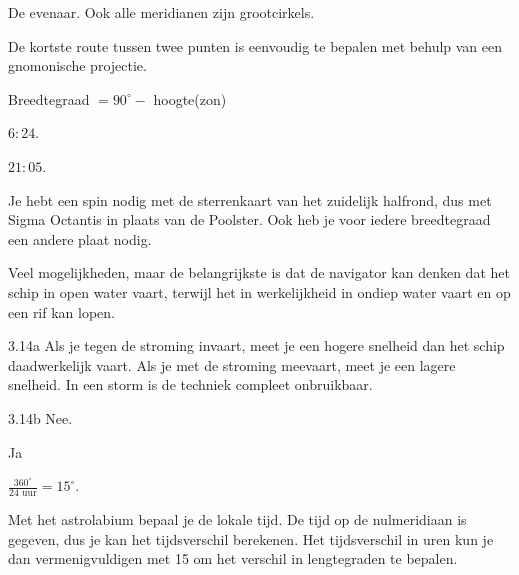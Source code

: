 \begin{Antwoord}{2.14}
		De evenaar. Ook alle meridianen zijn grootcirkels.
	
\end{Antwoord}
\begin{Antwoord}{2.15}
		De kortste route tussen twee punten is eenvoudig te bepalen met behulp van een gnomonische projectie.
	
\end{Antwoord}
\begin{Antwoord}{3.6}
  Breedtegraad $= 90^{\circ} -$ hoogte(zon)
 
\end{Antwoord}
\begin{Antwoord}{3.8}
  $6:24$.
 
\end{Antwoord}
\begin{Antwoord}{3.9}
  $21:05$.
 
\end{Antwoord}
\begin{Antwoord}{3.12}
  Je hebt een spin nodig met de sterrenkaart van het zuidelijk halfrond, dus met Sigma Octantis in plaats van de Poolster. Ook heb je voor iedere breedtegraad een andere plaat nodig.
 
\end{Antwoord}
\begin{Antwoord}{3.13}
  Veel mogelijkheden, maar de belangrijkste is dat de navigator kan denken dat het schip in open water vaart, terwijl het in werkelijkheid in ondiep water vaart en op een rif kan lopen.
 
\end{Antwoord}
\begin{Antwoord}{3.14a}
   Als je tegen de stroming invaart, meet je een hogere snelheid dan het schip daadwerkelijk vaart. Als je met de stroming meevaart, meet je een lagere snelheid. In een storm is de techniek compleet onbruikbaar.
  
\end{Antwoord}
\begin{Antwoord}{3.14b}
  Nee.
 
\end{Antwoord}
\begin{Antwoord}{3.15}
 Ja
\end{Antwoord}
\begin{Antwoord}{3.16}
 $\frac{360^{\circ}}{24 \textrm{ uur}} = 15^{\circ}$.
\end{Antwoord}
\begin{Antwoord}{3.17}
  Met het astrolabium bepaal je de lokale tijd. De tijd op de nulmeridiaan is gegeven, dus je kan het tijdsverschil berekenen. Het tijdsverschil in uren kun je dan vermenigvuldigen met 15 om het verschil in lengtegraden te bepalen.
 
\end{Antwoord}
